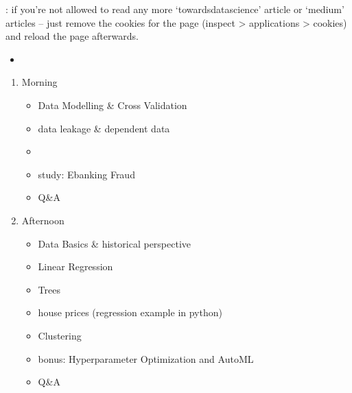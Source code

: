 \documentclass[letterpaper,10pt,english]{jupyterBook}
\begin{document}
\sphinxAtStartPar
{}: if you’re not allowed to read any more ‘towardsdatascience’ article or ‘medium’ articles – just remove the cookies for the page (inspect \sphinxhyphen{}> applications \sphinxhyphen{}> cookies) and reload the page afterwards.
\begin{itemize}
\item {} 
\sphinxAtStartPar
{}

\end{itemize}
\begin{enumerate}
%
\item {} 
\sphinxAtStartPar
Morning
\begin{itemize}
\item {} 
\sphinxAtStartPar
Data Modelling \& Cross Validation

\item {} 
\sphinxAtStartPar
data leakage \& dependent data

\item {} 
\sphinxAtStartPar
{}

\item {} 
\sphinxAtStartPar
study: Ebanking Fraud

\item {} 
\sphinxAtStartPar
Q\&A

\end{itemize}



\item {} 
\sphinxAtStartPar
Afternoon
\begin{itemize}
\item {} 
\sphinxAtStartPar
Data Basics \& historical perspective

\item {} 
\sphinxAtStartPar
Linear Regression

\item {} 
\sphinxAtStartPar
Trees

\item {} 
\sphinxAtStartPar
house prices (regression example in python)

\item {} 
\sphinxAtStartPar
Clustering

\item {} 
\sphinxAtStartPar
bonus: Hyperparameter Optimization and AutoML

\item {} 
\sphinxAtStartPar
Q\&A

\end{itemize}

\end{enumerate}
\end{document}
